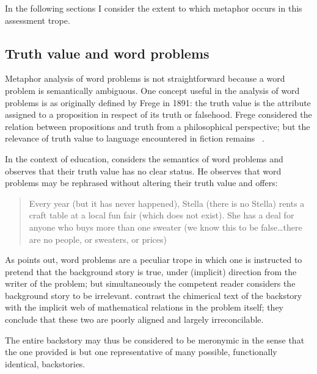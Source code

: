 In the following sections I consider the extent to which metaphor
occurs in this assessment trope.

\subsection{Truth value and word problems}

Metaphor analysis of word problems is not straightforward because a
word problem is semantically ambiguous.  One concept useful in the
analysis of word problems is  as originally
defined by Frege in 1891: the truth value is the attribute assigned to
a proposition in respect of its truth or falsehood.  Frege considered
the relation between propositions and truth from a philosophical
perspective; but the relevance of truth value to language encountered
in fiction remains ~\citep{lamarque1994}.

In the context of education,  considers the
semantics of word problems and observes that their truth value has no
clear status.  He observes that word problems may be rephrased without
altering their truth value and offers:

\begin{singlespace}
\begin{quote}
Every year (but it has never happened), Stella (there is no Stella)
rents a craft table at a local fun fair (which does not exist). She
has a deal for anyone who buys more than one sweater (we know this to
be false\ldots there are no people, or sweaters, or prices)
\end{quote}
\end{singlespace}

\noindent As  points out, word problems are a
peculiar trope in which one is instructed to pretend that the
background story is true, under (implicit) direction from the writer
of the problem; but simultaneously the competent reader considers the
background story to be irrelevant.   contrast the
chimerical text of the backstory with the implicit web of mathematical
relations in the problem itself; they conclude that these two
 are poorly aligned and largely
irreconcilable.

The entire backstory may thus be considered to be meronymic in the
sense that the one provided is but one representative of many
possible, functionally identical, backstories.


